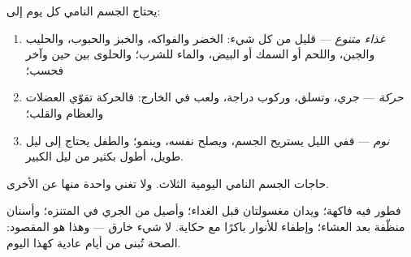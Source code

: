 \begin{proposition}\label{prop:g1:healthy-habits:needs}
يحتاج الجسم النامي كل يوم إلى:
\begin{enumerate}
  \item \emph{غذاء متنوع} --- قليل من كل شيء:
        الخضر والفواكه، والخبز والحبوب، والحليب والجبن، واللحم أو
        السمك أو البيض، والماء للشرب؛ والحلوى بين حين وآخر فحسب؛
  \item \emph{حركة} --- جري، وتسلق، وركوب دراجة، ولعب
        في الخارج: فالحركة تقوّي العضلات والعظام والقلب؛
  \item \emph{نوم} --- ففي الليل يستريح الجسم، ويصلح
        نفسه، وينمو؛ والطفل يحتاج إلى ليل طويل، أطول بكثير من ليل
        الكبير.
\end{enumerate}
\end{proposition}
\admitted

\begin{omfigure}

{\small حاجات الجسم النامي اليومية الثلاث. ولا تغني واحدة منها عن
الأخرى.}
\end{omfigure}

\begin{example}\label{ex:g1:healthy-habits:day}
فطور فيه فاكهة؛ ويدان مغسولتان قبل الغداء؛ وأصيل من الجري في
المتنزه؛ وأسنان منظّفة بعد العشاء؛ وإطفاء للأنوار باكرًا مع حكاية.
لا شيء خارق --- وهذا هو المقصود: الصحة تُبنى من أيام عادية كهذا
اليوم.
\end{example}

